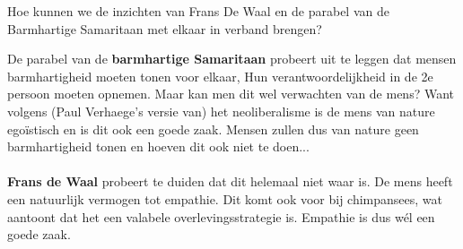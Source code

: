 \documentclass[main.tex]{subfiles}
\begin{document}
\begin{examenvraag}
    \begin{vraag}
        Hoe kunnen we de inzichten van Frans De Waal en de parabel van de Barmhartige Samaritaan met elkaar in verband brengen?
    \end{vraag}

    \begin{antwoord}
    	De parabel van de \textbf{barmhartige Samaritaan} probeert uit te leggen dat mensen barmhartigheid
    	moeten tonen voor elkaar, Hun verantwoordelijkheid in de 2e persoon moeten opnemen. Maar kan men dit wel verwachten van de mens? Want volgens (Paul Verhaege's
    	versie van) het neoliberalisme is de mens van nature egoïstisch en is dit ook een goede zaak.
    	Mensen zullen dus van nature geen barmhartigheid tonen en hoeven dit ook niet te doen...\\\\
    	\textbf{Frans de Waal} probeert te duiden dat dit helemaal niet waar is. De mens heeft een 
    	natuurlijk vermogen tot empathie. Dit komt ook voor bij chimpansees, wat aantoont dat
    	het een valabele overlevingsstrategie is. Empathie is dus wél een goede zaak.
    \end{antwoord}
\end{examenvraag}
\end{document}
